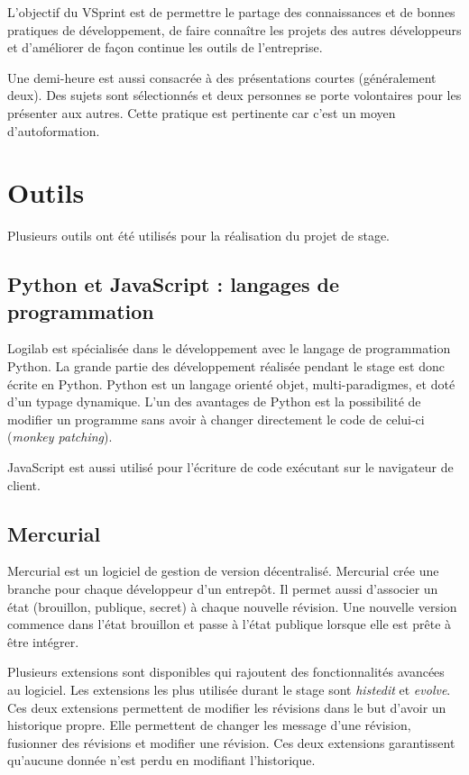 L'objectif du VSprint est de permettre le partage des connaissances et de
bonnes pratiques de développement, de faire connaître les projets des autres
développeurs et d'améliorer de façon continue les outils de l'entreprise. 

Une demi-heure est aussi consacrée à des présentations courtes (généralement deux). Des
sujets sont sélectionnés et deux personnes se porte volontaires pour les
présenter aux autres. Cette pratique est pertinente car c'est un moyen
d'autoformation.

\section{Outils} 
Plusieurs outils ont été utilisés pour la réalisation du projet de stage. 

\subsection{Python et JavaScript : langages de programmation} 
Logilab est spécialisée dans le développement avec le langage de programmation 
Python. La grande partie des développement réalisée pendant le stage est donc 
écrite en Python. Python est un langage orienté objet, multi-paradigmes, et 
doté d'un typage dynamique. L'un des avantages de Python est la possibilité de 
modifier un programme sans avoir à changer directement le code de celui-ci
(\textit{monkey patching}).

JavaScript est aussi utilisé pour l'écriture de code exécutant sur le
navigateur de client. 

\subsection{Mercurial} 
Mercurial est un logiciel de gestion de version décentralisé. Mercurial crée une 
branche pour chaque développeur d'un entrepôt. Il permet aussi d'associer un état 
(brouillon, publique, secret) à chaque nouvelle révision. Une nouvelle version 
commence dans l'état brouillon et passe à l'état publique lorsque elle est prête 
à être intégrer. 

Plusieurs extensions sont disponibles qui rajoutent des fonctionnalités
avancées au logiciel. Les extensions les plus utilisée durant le stage sont
\textit{histedit} et \textit{evolve}. Ces deux extensions permettent de
modifier les révisions dans le but d'avoir un historique propre. Elle
permettent de changer les message d'une révision, fusionner des révisions et
modifier une révision. Ces deux extensions garantissent qu'aucune donnée n'est
perdu en modifiant l'historique. 


